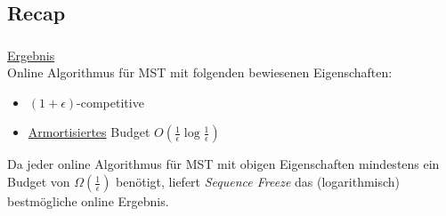 \subsection{Recap}
\begin{frame}
    \frametitle{\insertsection}
    \underline{Ergebnis}\\
    \vspace{1em}
    Online Algorithmus für MST mit folgenden bewiesenen Eigenschaften:\\
    \vspace{1em}
    \begin{itemize}
        \itemsep\setlength{.8em}
        \item $(1+\epsilon)$-competitive
        \item \underline{Armortisiertes} Budget $O(\frac{1}{\epsilon}\log\frac{1}{\epsilon})$
    \end{itemize}
    \vspace{1em}
    Da jeder online Algorithmus für MST mit obigen Eigenschaften mindestens ein Budget von $\Omega(\frac{1}{\epsilon})$ benötigt, liefert \emph{Sequence Freeze} das (logarithmisch) bestmögliche online Ergebnis.
\end{frame}